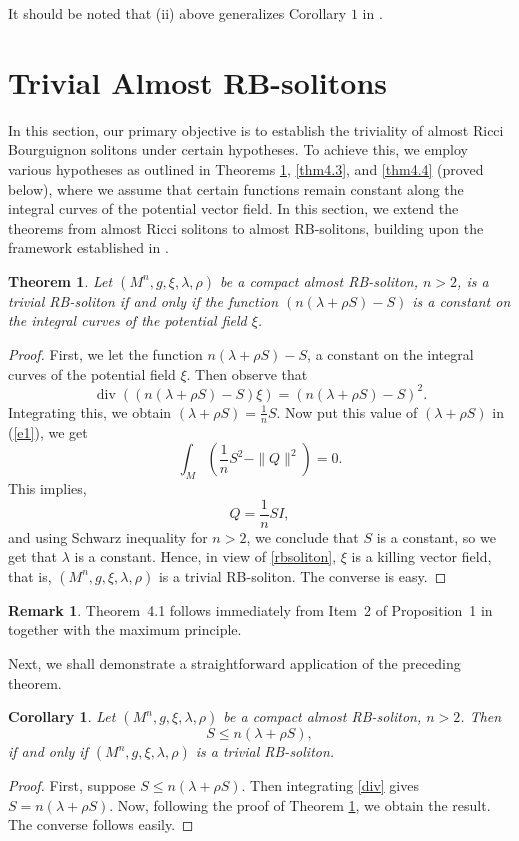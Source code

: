 \documentclass[a4paper, twoside, 10pt]{article}
\numberwithin{equation}{section}
\newtheorem{theorem}{Theorem}[section]
\newtheorem{corollary}{Corollary}[section]
\theoremstyle{definition}
\newtheorem{remark}{Remark}[section]
\begin{document}
It should be noted that (ii) above generalizes
Corollary $1$ in \cite{barros2012some}.

 
\section{Trivial Almost RB-solitons}\label{trival}
In this section, our primary objective is to establish the triviality of almost Ricci Bourguignon solitons under certain hypotheses. To achieve this, we employ various hypotheses as outlined in Theorems \ref{3.3}, \ref{thm4.3}, and \ref{thm4.4} (proved below), where we assume that certain functions remain constant along the integral curves of the potential vector field. In this section, we extend the theorems from almost Ricci solitons to almost RB-solitons, building upon the framework established in \cite{SDANARS}. 


 \begin{theorem}\label{3.3}
     Let $(M^n,g,\xi,\lambda,\rho)$ be a compact almost RB-soliton, $n>2$, is a trivial RB-soliton if and only if the function $(n(\lambda + \rho S)-S)$ is a constant on the integral curves of the potential field $\xi$.
 \end{theorem}
 \begin{proof}
First, we let the function $n(\lambda + \rho S)-S$, a constant on the integral curves of the potential field $\xi$. Then observe that
$$\operatorname{div}((n(\lambda+\rho S)-S)\xi)=(n(\lambda+\rho S)-S)^2.$$ 
Integrating this, we obtain
$(\lambda+\rho S)=\frac{1}{n}S$. Now put this value of $(\lambda+\rho S)$ in (\ref{e1}), we get
\[
\int_M\left(\frac{1}{n}S^2-\|Q\|^2\right)=0.
\]
This implies,
\[Q=\frac{1}{n}SI,\]
 and using Schwarz inequality for $n>2$, we conclude that $S$ is a constant, so we get that $\lambda$ is a constant. Hence, in view of  \eqref{rbsoliton}, $\xi$ is a killing vector field, that is, $(M^n,g,\xi,\lambda,\rho)$ is a trivial RB-soliton. The converse is easy.
 \end{proof}

\begin{remark}
Theorem~4.1 follows immediately from Item~2 of Proposition~1 in \cite{barros2013note} together with the maximum principle.
\end{remark}


Next, we shall demonstrate a straightforward application of the preceding theorem.
 \begin{corollary}\label{trc}
     Let $(M^n,g,\xi,\lambda,\rho)$ be a compact almost RB-soliton, $n>2$. Then
    $$S\leq n(\lambda+\rho S),$$
     if and only if $(M^n,g,\xi,\lambda,\rho)$ is a trivial RB-soliton.
 \end{corollary}
 \begin{proof}
First, suppose $S\leq n(\lambda+\rho S)$. Then integrating \eqref{div} gives $S=n(\lambda+\rho S)$. Now, following the proof of Theorem \ref{3.3}, we obtain the result. The converse follows easily.
\end{proof}
\noindent
\end{document}
